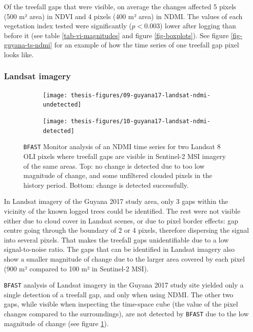 \documentclass[a4paper,12pt]{scrbook}
\begin{document}
Of the treefall gaps that were visible, on average the changes affected 5 pixels (500 m² area) in NDVI and 4 pixels (400 m² area) in NDMI. The values of each vegetation index tested were significantly ($ p < 0.003 $) lower after logging than before it (see table \ref{tab-vi-magnitudes} and figure \ref{fig-boxplots}). See figure \ref{fig-guyana-ts-ndmi} for an example of how the time series of one treefall gap pixel looks like.

\subsubsection{Landsat imagery}

\begin{figure}
  \begin{subfigure}{\textwidth}
    \centering
    \texttt{[image: thesis-figures/09-guyana17-landsat-ndmi-undetected]}
  \end{subfigure}
  \begin{subfigure}{\textwidth}
    \centering
    \texttt{[image: thesis-figures/10-guyana17-landsat-ndmi-detected]}
  \end{subfigure}
  
  \caption{\texttt{BFAST} Monitor analysis of an \ac{NDMI} time series for two Landsat 8 \ac{OLI} pixels where treefall gaps are visible in Sentinel-2 \ac{MSI} imagery of the same areas. Top: no change is detected due to too low magnitude of change, and some unfiltered clouded pixels in the history period. Bottom: change is detected successfully.}
  \label{fig-guyana17-landsat-ndmi}
\end{figure}

In Landsat imagery of the Guyana 2017 study area, only 3 gaps within the vicinity of the known logged trees could be identified. The rest were not visible either due to cloud cover in Landsat scenes, or due to pixel border effects: gap centre going through the boundary of 2 or 4 pixels, therefore dispersing the signal into several pixels. That makes the treefall gaps unidentifiable due to a low signal-to-noise ratio. The gaps that can be identified in Landsat imagery also show a smaller magnitude of change due to the larger area covered by each pixel (900 m² compared to 100 m² in Sentinel-2 \ac{MSI}).

\texttt{BFAST} analysis of Landsat imagery in the Guyana 2017 study site yielded only a single detection of a treefall gap, and only when using \ac{NDMI}. The other two gaps, while visible when inspecting the time-space cube (the value of the pixel changes compared to the surroundings), are not detected by \texttt{BFAST} due to the low magnitude of change (see figure \ref{fig-guyana17-landsat-ndmi}).
\end{document}
